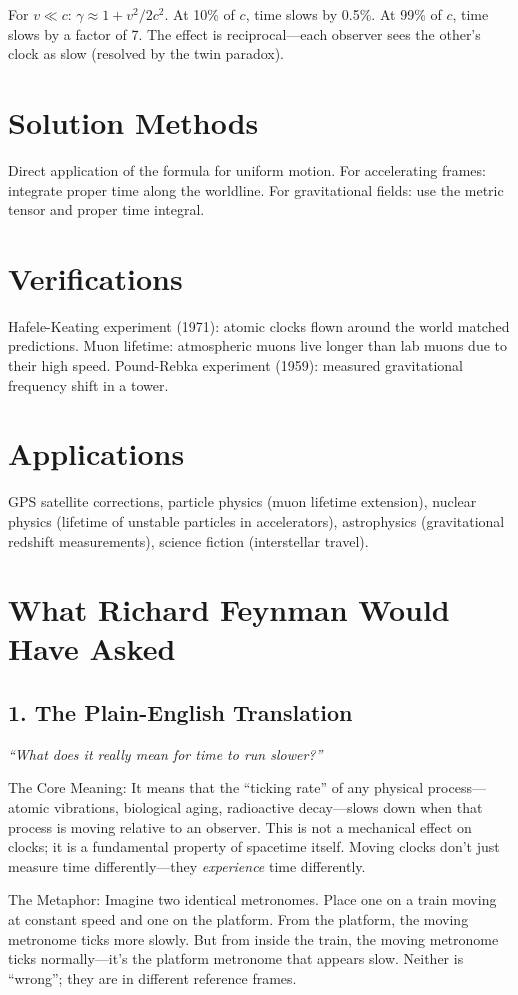 For $v \ll c$: $\gamma \approx 1 + v^2/2c^2$. At 10\% of $c$, time slows by 0.5\%. At 99\% of $c$, time slows by a factor of 7. The effect is reciprocal---each observer sees the other's clock as slow (resolved by the twin paradox).
\section*{Solution Methods}

Direct application of the formula for uniform motion. For accelerating frames: integrate proper time along the worldline. For gravitational fields: use the metric tensor and proper time integral.
\section*{Verifications}

Hafele-Keating experiment (1971): atomic clocks flown around the world matched predictions. Muon lifetime: atmospheric muons live longer than lab muons due to their high speed. Pound-Rebka experiment (1959): measured gravitational frequency shift in a tower.
\section*{Applications}

GPS satellite corrections, particle physics (muon lifetime extension), nuclear physics (lifetime of unstable particles in accelerators), astrophysics (gravitational redshift measurements), science fiction (interstellar travel).
\section*{What Richard Feynman Would Have Asked}

\subsection*{1. The Plain-English Translation}
\textit{``What does it really mean for time to run slower?''}

The Core Meaning: It means that the ``ticking rate'' of any physical process---atomic vibrations, biological aging, radioactive decay---slows down when that process is moving relative to an observer. This is not a mechanical effect on clocks; it is a fundamental property of spacetime itself. Moving clocks don't just measure time differently---they \emph{experience} time differently.

The Metaphor: Imagine two identical metronomes. Place one on a train moving at constant speed and one on the platform. From the platform, the moving metronome ticks more slowly. But from inside the train, the moving metronome ticks normally---it's the platform metronome that appears slow. Neither is ``wrong''; they are in different reference frames.

